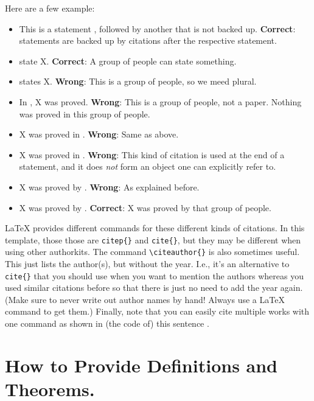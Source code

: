 Here are a few example:
\begin{itemize}
  \item This is a statement \citep{Smith2021Wubalubadubdub}, followed by another that is not backed up. \textbf{Correct}: statements are backed up by citations after the respective statement.
  \item \cite{Smith2021Wubalubadubdub} state X. \textbf{Correct}: A group of people can state something.
  \item \cite{Smith2021Wubalubadubdub} states X. \textbf{Wrong}: This is a group of people, so we meed plural.
  \item In \cite{Smith2021Wubalubadubdub}, X was proved. \textbf{Wrong}: This is a group of people, not a paper. Nothing was proved in this group of people.
  \item X was proved in \cite{Smith2021Wubalubadubdub}. \textbf{Wrong}: Same as above.
  \item X was proved in \citep{Smith2021Wubalubadubdub}. \textbf{Wrong}: This kind of citation is used at the end of a statement, and it does \emph{not} form an object one can explicitly refer to.
  \item X was proved by \citep{Smith2021Wubalubadubdub}. \textbf{Wrong}: As explained before.
  \item X was proved by \cite{Smith2021Wubalubadubdub}. \textbf{Correct}: X was proved by that group of people.
\end{itemize}

\LaTeX{} provides different commands for these different kinds of citations. In this template, those those are \verb!citep{}! and \verb!cite{}!, but they may be different when using other authorkits. The command \verb!\citeauthor{}! is also sometimes useful. This just lists the author(s), but without the year. I.e., it's an alternative  to \verb!cite{}! that you should use when you want to mention the authors whereas you used similar citations before so that there is just no need to add the year again. (Make sure to never write out author names by hand! Always use a \LaTeX{} command to get them.) Finally, note that you can easily cite multiple works with one command as shown in (the code of) this sentence \citep{Cooper2015SuperfluidVacuumTheory,Smith2021Wubalubadubdub}.
  
    
  
\section{How to Provide Definitions and Theorems.} 

